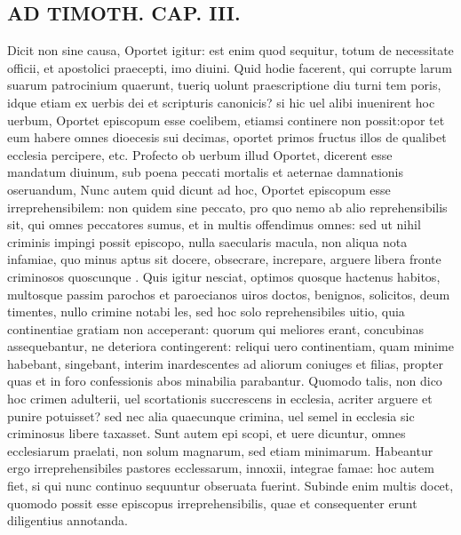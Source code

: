 \documentclass{article}
\begin{document}
\begin{pages}
\section*{AD TIMOTH. CAP. III. }
\marginpar{[ p.491 ]}\pstart Dicit non sine causa, Oportet igitur: est enim quod sequitur, totum de necessitate officii, et apostolici praecepti, imo diuini. Quid hodie facerent, qui corrupte larum suarum patrocinium quaerunt, tueriq uolunt praescriptione diu turni tem poris, idque etiam ex uerbis dei et scripturis canonicis? si hic uel alibi inuenirent hoc uerbum, Oportet episcopum esse coelibem, etiamsi continere non possit:opor tet eum habere omnes dioecesis sui decimas, oportet primos fructus illos de qualibet ecclesia percipere, etc. Profecto ob uerbum illud Oportet, dicerent esse mandatum diuinum, sub poena peccati mortalis et aeternae damnationis oseruandum, Nunc autem quid dicunt ad hoc, Oportet episcopum esse irreprehensibilem: non quidem sine peccato, pro quo nemo ab alio reprehensibilis sit, qui omnes peccatores sumus, et in multis offendimus omnes: sed ut nihil criminis impingi possit episcopo, nulla saecularis macula, non aliqua nota infamiae, quo minus aptus sit docere, obsecrare, increpare, arguere libera fronte criminosos quoscunque . Quis igitur nesciat, optimos quosque hactenus habitos, multosque passim parochos et paroecianos uiros doctos, benignos, solicitos, deum timentes, nullo crimine notabi les, sed hoc solo reprehensibiles uitio, quia continentiae gratiam non acceperant: quorum qui meliores erant, concubinas assequebantur, ne deteriora contingerent: reliqui uero continentiam, quam minime habebant, singebant, interim inardescentes ad aliorum coniuges et filias, propter quas et in foro confessionis abos minabilia parabantur. Quomodo talis, non dico hoc crimen adulterii, uel scortationis succrescens in ecclesia, acriter arguere et punire potuisset? sed nec alia quaecunque crimina, uel semel in ecclesia sic criminosus libere taxasset. Sunt autem epi scopi, et uere dicuntur, omnes ecclesiarum praelati, non solum magnarum, sed etiam minimarum. Habeantur ergo irreprehensibiles pastores ecclessarum, innoxii, integrae famae: hoc autem fiet, si qui nunc continuo sequuntur obseruata fuerint. Subinde enim multis docet, quomodo possit esse episcopus irreprehensibilis, quae et consequenter erunt diligentius annotanda.  \pend
{}
{}

\end{pages}
\end{document}
